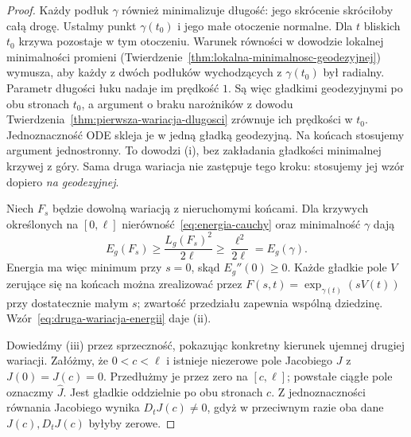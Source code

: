\begin{proof}
Każdy podłuk $\gamma$ również minimalizuje długość:
jego skrócenie skróciłoby całą drogę. Ustalmy punkt
$\gamma(t_0)$ i jego małe otoczenie normalne. Dla
$t$ bliskich $t_0$ krzywa pozostaje w tym otoczeniu.
Warunek równości w dowodzie lokalnej minimalności
promieni (Twierdzenie~\ref{thm:lokalna-minimalnosc-geodezyjnej})
wymusza, aby każdy z dwóch podłuków wychodzących
z $\gamma(t_0)$ był radialny. Parametr długości łuku
nadaje im prędkość $1$. Są więc gładkimi geodezyjnymi
po obu stronach $t_0$, a argument o braku narożników
z dowodu Twierdzenia~\ref{thm:pierwsza-wariacja-dlugosci}
zrównuje ich prędkości w $t_0$. Jednoznaczność ODE
skleja je w jedną gładką geodezyjną. Na końcach stosujemy
argument jednostronny. To dowodzi (i), bez zakładania
gładkości minimalnej krzywej z góry.
Sama druga wariacja nie zastępuje tego kroku:
stosujemy jej wzór dopiero \emph{na geodezyjnej}.

Niech $F_s$ będzie dowolną wariacją z nieruchomymi
końcami. Dla krzywych określonych na
$[0,\ell]$ nierówność~\eqref{eq:energia-cauchy}
oraz minimalność $\gamma$ dają
\[
 E_g(F_s)\geq\frac{L_g(F_s)^2}{2\ell}
             \geq\frac{\ell^2}{2\ell}
             =E_g(\gamma).
\]
Energia ma więc minimum przy $s=0$, skąd
$E_g''(0)\geq0$. Każde gładkie pole $V$
zerujące się na końcach można zrealizować
przez $F(s,t)=\exp_{\gamma(t)}(sV(t))$
przy dostatecznie małym $s$; zwartość
przedziału zapewnia wspólną dziedzinę.
Wzór~\eqref{eq:druga-wariacja-energii}
daje (ii).

Dowiedźmy (iii) przez sprzeczność, pokazując
konkretny kierunek ujemnej drugiej wariacji.
Załóżmy, że $0<c<\ell$ i istnieje niezerowe
pole Jacobiego $J$ z $J(0)=J(c)=0$.
Przedłużmy je przez zero na $[c,\ell]$;
powstałe ciągłe pole oznaczmy $\widehat J$.
Jest gładkie oddzielnie po obu stronach $c$.
Z jednoznaczności równania Jacobiego wynika
$D_tJ(c)\ne0$, gdyż w przeciwnym razie
oba dane $J(c),D_tJ(c)$ byłyby zerowe.


\end{proof}

